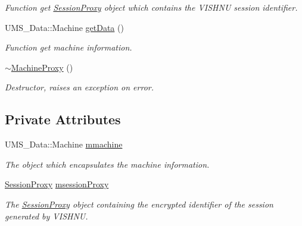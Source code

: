 \begin{DoxyCompactItemize}
\begin{DoxyCompactList}\small\item\em Function get \hyperlink{classSessionProxy}{SessionProxy} object which contains the VISHNU session identifier. \item\end{DoxyCompactList}\item 
UMS\_\-Data::Machine \hyperlink{classMachineProxy_ad5240c0041eec2226927a59a2228ce04}{getData} ()
\begin{DoxyCompactList}\small\item\em Function get machine information. \item\end{DoxyCompactList}\item 
\hypertarget{classMachineProxy_a99e08cba4ed0c8660f458b3126f2a770}{
\hyperlink{classMachineProxy_a99e08cba4ed0c8660f458b3126f2a770}{$\sim$MachineProxy} ()}
\label{classMachineProxy_a99e08cba4ed0c8660f458b3126f2a770}

\begin{DoxyCompactList}\small\item\em Destructor, raises an exception on error. \item\end{DoxyCompactList}\end{DoxyCompactItemize}
\subsection*{Private Attributes}
\begin{DoxyCompactItemize}
\item 
\hypertarget{classMachineProxy_ad9ed88d12742423f0a26a6a8fbdf936a}{
UMS\_\-Data::Machine \hyperlink{classMachineProxy_ad9ed88d12742423f0a26a6a8fbdf936a}{mmachine}}
\label{classMachineProxy_ad9ed88d12742423f0a26a6a8fbdf936a}

\begin{DoxyCompactList}\small\item\em The object which encapsulates the machine information. \item\end{DoxyCompactList}\item 
\hypertarget{classMachineProxy_a0cfb78a0be657dd4b7fa3ba62c164ab4}{
\hyperlink{classSessionProxy}{SessionProxy} \hyperlink{classMachineProxy_a0cfb78a0be657dd4b7fa3ba62c164ab4}{msessionProxy}}
\label{classMachineProxy_a0cfb78a0be657dd4b7fa3ba62c164ab4}

\begin{DoxyCompactList}\small\item\em The \hyperlink{classSessionProxy}{SessionProxy} object containing the encrypted identifier of the session generated by VISHNU. \item\end{DoxyCompactList}\end{DoxyCompactItemize}


